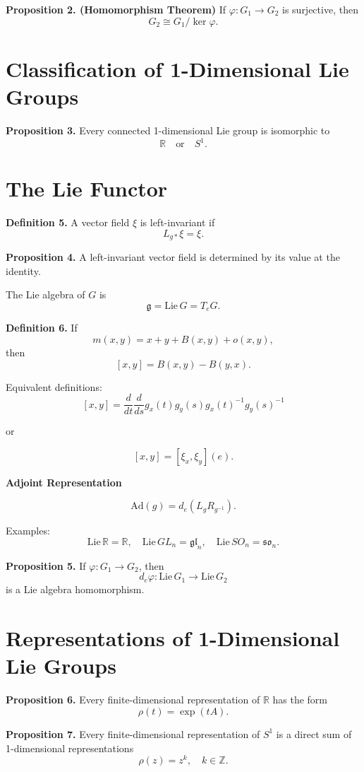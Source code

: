 \textbf{Proposition 2. (Homomorphism Theorem)}
If $\varphi:G_1\to G_2$ is surjective, then
\[
G_2 \cong G_1/\ker\varphi.
\]

\section*{Classification of 1-Dimensional Lie Groups}

\textbf{Proposition 3.}
Every connected 1-dimensional Lie group is isomorphic to
\[
\mathbb{R} \quad \text{or} \quad S^1.
\]

\section*{The Lie Functor}

\textbf{Definition 5.}
A vector field $\xi$ is left-invariant if
\[
L_{g*}\xi=\xi.
\]

\textbf{Proposition 4.}
A left-invariant vector field is determined by its value at the identity.

The Lie algebra of $G$ is
\[
\mathfrak{g} = \mathrm{Lie}\,G = T_eG.
\]

\textbf{Definition 6.}
If
\[
m(x,y)=x+y+B(x,y)+o(x,y),
\]
then
\[
[x,y]=B(x,y)-B(y,x).
\]

Equivalent definitions:
\[
[x,y]=\frac{d}{dt}\frac{d}{ds}
g_x(t)g_y(s)g_x(t)^{-1}g_y(s)^{-1}
\]

or

\[
[x,y]=[\xi_x,\xi_y](e).
\]

\textbf{Adjoint Representation}

\[
\mathrm{Ad}(g)=d_e(L_gR_{g^{-1}}).
\]

Examples:
\[
\mathrm{Lie}\,\mathbb{R}=\mathbb{R},
\quad
\mathrm{Lie}\,GL_n=\mathfrak{gl}_n,
\quad
\mathrm{Lie}\,SO_n=\mathfrak{so}_n.
\]

\textbf{Proposition 5.}
If $\varphi:G_1\to G_2$, then
\[
d_e\varphi:\mathrm{Lie}\,G_1\to \mathrm{Lie}\,G_2
\]
is a Lie algebra homomorphism.

\section*{Representations of 1-Dimensional Lie Groups}

\textbf{Proposition 6.}
Every finite-dimensional representation of $\mathbb{R}$ has the form
\[
\rho(t)=\exp(tA).
\]

\textbf{Proposition 7.}
Every finite-dimensional representation of $S^1$
is a direct sum of 1-dimensional representations
\[
\rho(z)=z^k, \quad k\in\mathbb{Z}.
\]

